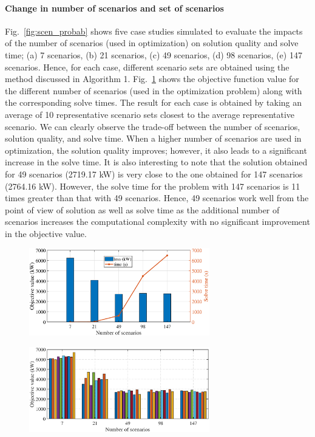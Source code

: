 \paragraph{Change in number of scenarios and set of scenarios} 
Fig.~\ref{fig:scen_probab} shows five case studies simulated to evaluate the impacts of the number of scenarios (used in optimization) on solution quality and solve time; (a) 7 scenarios, (b) 21 scenarios, (c) 49 scenarios, (d) 98 scenarios, (e) 147 scenarios.  Hence, for each case, different scenario sets are obtained using the method discussed in Algorithm 1. Fig.~\ref{fig:scen_vs_time} shows the objective function value for the different number of scenarios (used in the optimization problem) along with the corresponding solve times. The result for each case is obtained by taking an average of 10 representative scenario sets closest to the average representative scenario. We can clearly observe the trade-off between the number of scenarios, solution quality, and solve time. When a higher number of scenarios are used in optimization, the solution quality improves; however, it also leads to a significant increase in the solve time. It is also interesting to note that the solution obtained for 49 scenarios (2719.17 kW) is very close to the one obtained for 147 scenarios (2764.16 kW). However, the solve time for the problem with 147 scenarios is 11 times greater than that with 49 scenarios. Hence, 49 scenarios work well from the point of view of solution as well as solve time as the additional number of scenarios increases the computational complexity with no significant improvement in the objective value.

\begin{figure}[!t!]
    \centering
    \includegraphics[width=0.7\textwidth]{figures/scenario_vs_time.eps}
    \caption{}
    \label{fig:scen_vs_time}
\end{figure}

\begin{figure}[t]
    \centering
    \includegraphics[width=0.7\textwidth]{figures/bundled_scenarios.eps}
    \caption{}
    \label{fig:scen_sets}
\end{figure}
